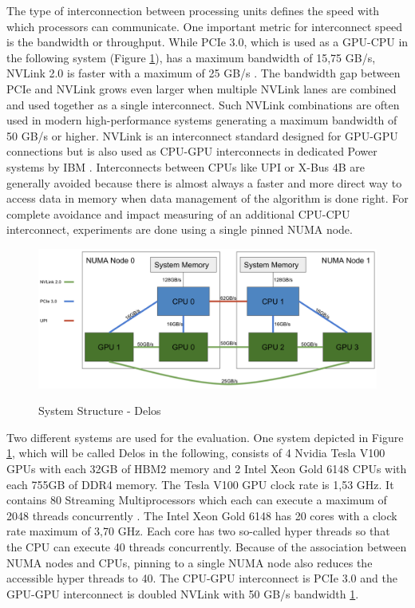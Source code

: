 The type of interconnection between processing units defines the speed with which processors can communicate. One important metric for interconnect speed is the bandwidth or throughput. While PCIe 3.0, which is used as a GPU-CPU in the following system (Figure \ref{fig:delos_arch}), has a maximum bandwidth of 15,75 GB/s, NVLink 2.0 is faster with a maximum of 25 GB/s \cite{zargesEvaluationOnNodeGPU}. The bandwidth gap between PCIe and NVLink grows even larger when multiple NVLink lanes are combined and used together as a single interconnect. Such NVLink combinations are often used in modern high-performance systems generating a maximum bandwidth of 50 GB/s or higher. NVLink is an interconnect standard designed for GPU-GPU connections but is also used as CPU-GPU interconnects in dedicated Power systems by IBM \cite{liEvaluatingModernGPU2020}. Interconnects between CPUs like UPI or X-Bus 4B are generally avoided because there is almost always a faster and more direct way to access data in memory when data management of the algorithm is done right. For complete avoidance and impact measuring of an additional CPU-CPU interconnect, experiments are done using a single pinned NUMA node.

\begin{figure}[H]
  \caption{System Structure - Delos}
  \includegraphics[width=\textwidth]{figures/delos_system_arch.png}
  \centering
  \label{fig:delos_arch}
\end{figure}

Two different systems are used for the evaluation. One system depicted in Figure \ref{fig:delos_arch}, which will be called Delos in the following, consists of 4 Nvidia Tesla V100 GPUs with each 32GB of HBM2 memory and 2 Intel Xeon Gold 6148 CPUs with each 755GB of DDR4 memory. The Tesla V100 GPU clock rate is 1,53 GHz. It contains 80 Streaming Multiprocessors which each can execute a maximum of 2048 threads concurrently \cite{NVIDIATESLAV1002017}. The Intel Xeon Gold 6148 has 20 cores with a clock rate maximum of 3,70 GHz. Each core has two so-called hyper threads so that the CPU can execute 40 threads concurrently. Because of the association between NUMA nodes and CPUs, pinning to a single NUMA node also reduces the accessible hyper threads to 40. The CPU-GPU interconnect is PCIe 3.0 and the GPU-GPU interconnect is doubled NVLink with 50 GB/s bandwidth \ref{fig:delos_arch}.


